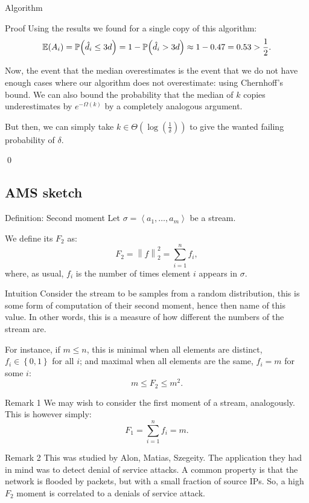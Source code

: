 \documentclass[a4paper]{article}
\begin{document}
\begin{parag}{Algorithm}
\begin{subparag}{Proof}
        Using the results we found for a single copy of this algorithm:
        \[\exval\left(A_i\right) = \prob\left(\hat{d}_i \leq 3d\right) = 1 - \prob\left(\hat{d}_i > 3d\right) \approx 1 - 0.47 = 0.53 > \frac{1}{2}.\]
        
        Now, the event that the median overestimates is the event that we do not have enough cases where our algorithm does not overestimate:
        using Chernhoff's bound. We can also bound the probability that the median of $k$ copies underestimates by $e^{- \Omega\left(k\right)}$ by a completely analogous argument.
        
        But then, we can simply take $k \in \Theta\left(\log\left(\frac{1}{\delta}\right)\right)$ to give the wanted failing probability of $\delta$.

        \qed
    \end{subparag}
\end{parag}

\subsection{AMS sketch}

\begin{parag}{Definition: Second moment}
    Let $\sigma = \left\langle a_1, \ldots, a_m \right\rangle$ be a stream.

    We define its  $F_2$ as: 
    \[F_2 = \left\|f\right\|_2^2 = \sum_{i=1}^{n} f_i,\]
    where, as usual, $f_i$ is the number of times element $i$ appears in $\sigma$.

    \begin{subparag}{Intuition}
        Consider the stream to be samples from a random distribution, this is some form of computation of their second moment, hence then name of this value. In other words, this is a measure of how different the numbers of the stream are.

        For instance, if $m \leq n$, this is minimal when all elements are distinct, $f_i \in \left\{0, 1\right\}$ for all $i$; and maximal when all elements are the same, $f_i = m$ for some $i$: 
        \[m \leq F_2 \leq m^2.\]
    \end{subparag}

    \begin{subparag}{Remark 1}
        We may wish to consider the first moment of a stream, analogously. This is however simply: 
        \[F_1 = \sum_{i=1}^{n} f_i = m.\]
    \end{subparag}

    \begin{subparag}{Remark 2}
        This was studied by Alon, Matias, Szegeity. The application they had in mind was to detect denial of service attacks. A common property is that the network is flooded by packets, but with a small fraction of source IPs. So, a high $F_2$ moment is correlated to a denials of service attack.
    \end{subparag}
\end{parag}
\end{document}
